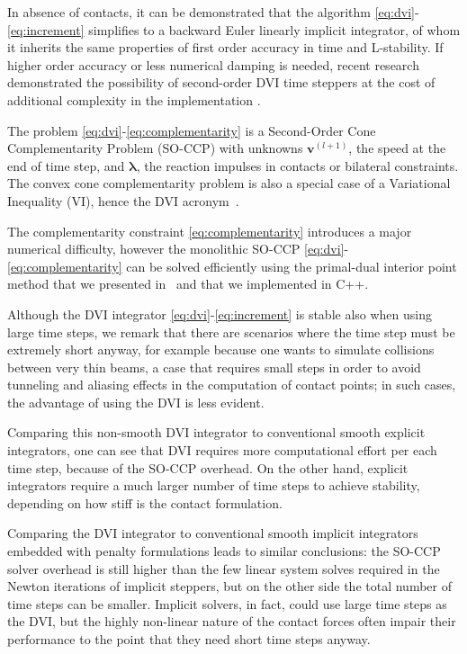 \documentclass[review]{elsarticle}
\def\avect#1{{\boldsymbol{#1}}}
\begin{document}
In absence of contacts, it can be demonstrated that the algorithm \eqref{eq:dvi}-\eqref{eq:increment} simplifies to a backward Euler linearly implicit integrator, of whom it inherits the same properties of first order accuracy in time and L-stability. If higher order accuracy or less numerical damping is needed, recent research demonstrated the possibility of second-order DVI time steppers at the cost of additional complexity in the implementation \cite{bruls2018constraints}.

The problem \eqref{eq:dvi}-\eqref{eq:complementarity} is a Second-Order Cone Complementarity Problem (SO-CCP) with unknowns $\avect{v}^{(l+1)}$, the speed at the end of time step, and $\avect{\lambda}$, the reaction impulses in contacts or bilateral constraints. The convex cone complementarity problem is also a special case of a Variational Inequality (VI), hence the DVI acronym~\cite{StPa08}.

The complementarity constraint \eqref{eq:complementarity} introduces a major numerical difficulty, however the monolithic SO-CCP \eqref{eq:dvi}-\eqref{eq:complementarity} can be solved efficiently using the primal-dual interior point method that we presented in~\cite{MANGONI2018351} and that we implemented in C++.

Although the DVI integrator \eqref{eq:dvi}-\eqref{eq:increment} is stable also when using large time steps, we remark that there are scenarios where the time step must be extremely short anyway, for example because one wants to simulate collisions between very thin beams, a case that requires small steps in order to avoid tunneling and aliasing effects in the computation of contact points; in such cases, the advantage of using the DVI is less evident. 

Comparing this non-smooth DVI integrator to conventional smooth explicit integrators, one can see that DVI requires more computational effort per each time step, because of the SO-CCP overhead. On the other hand, explicit integrators require a much larger number of time steps to achieve stability, depending on how stiff is the contact formulation. 

Comparing the DVI integrator to conventional smooth implicit integrators embedded with penalty formulations leads to similar conclusions: the SO-CCP solver overhead is still higher than the few linear system solves required in the Newton iterations of implicit steppers, but on the other side the total number of time steps can be smaller. Implicit solvers, in fact, could use large time steps as the DVI, but the highly non-linear nature of the contact forces often impair their performance to the point that they need short time steps anyway. 
\end{document}
